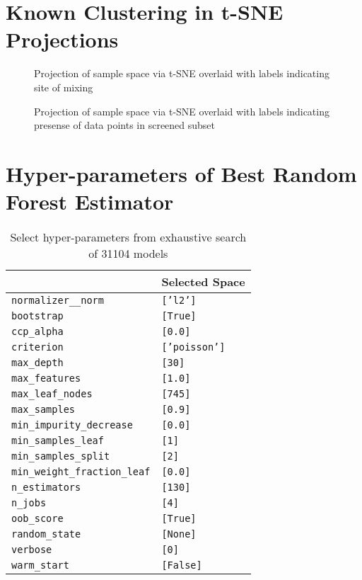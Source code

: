 \section{Known Clustering in t-SNE Projections}
\label{sec:org4aa92f2}
 
\begin{figure}[htbp]
\centering

\caption{\label{fig:alloys} Projection of sample space via t-SNE overlaid with labels indicating site of mixing}
\end{figure}

 
\begin{figure}[htbp]
\centering

\caption{\label{fig:chosen} Projection of sample space via t-SNE overlaid with labels indicating presense of data points in screened subset}
\end{figure}

\section{Hyper-parameters of Best Random Forest Estimator}
\label{sec:org6b04a78}

\begin{table}[htbp]
\caption{\label{tbl:rfrHPO} Select hyper-parameters from exhaustive search of 31104 models}
\centering
\begin{tabular}{ll}
 & Selected Space\\[0pt]
\hline
\texttt{normalizer\_\_norm} & \texttt{['l2']}\\[0pt]
\texttt{bootstrap} & \texttt{[True]}\\[0pt]
\texttt{ccp\_alpha} & \texttt{[0.0]}\\[0pt]
\texttt{criterion} & \texttt{['poisson']}\\[0pt]
\texttt{max\_depth} & \texttt{[30]}\\[0pt]
\texttt{max\_features} & \texttt{[1.0]}\\[0pt]
\texttt{max\_leaf\_nodes} & \texttt{[745]}\\[0pt]
\texttt{max\_samples} & \texttt{[0.9]}\\[0pt]
\texttt{min\_impurity\_decrease} & \texttt{[0.0]}\\[0pt]
\texttt{min\_samples\_leaf} & \texttt{[1]}\\[0pt]
\texttt{min\_samples\_split} & \texttt{[2]}\\[0pt]
\texttt{min\_weight\_fraction\_leaf} & \texttt{[0.0]}\\[0pt]
\texttt{n\_estimators} & \texttt{[130]}\\[0pt]
\texttt{n\_jobs} & \texttt{[4]}\\[0pt]
\texttt{oob\_score} & \texttt{[True]}\\[0pt]
\texttt{random\_state} & \texttt{[None]}\\[0pt]
\texttt{verbose} & \texttt{[0]}\\[0pt]
\texttt{warm\_start} & \texttt{[False]}\\[0pt]
\end{tabular}
\end{table}
